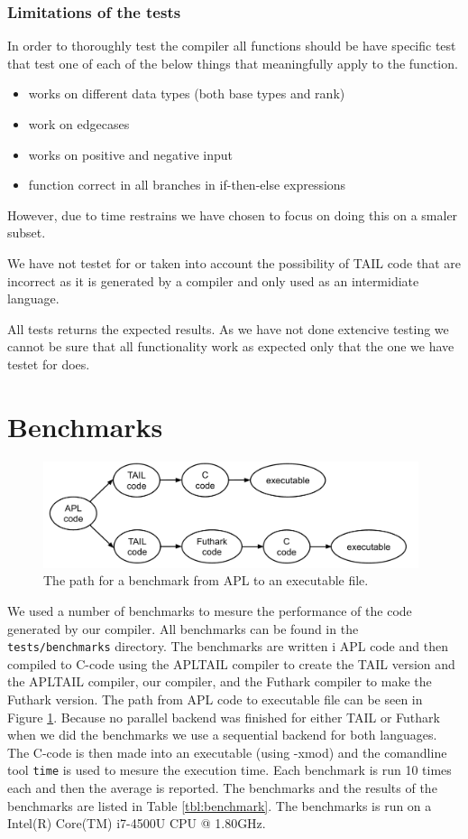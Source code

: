 \documentclass[11pt]{article}
\begin{document}
\subsubsection{Limitations of the tests}
In order to thoroughly test the compiler all functions should be have specific test that test one of each of the below things
that meaningfully apply to the function. 
\begin{itemize}
\item works on different data types (both base types and rank)
\item work on edgecases
\item works on positive and negative input
\item function correct in all branches in if-then-else expressions
\end{itemize}
However, due to time restrains we have chosen to focus on doing this on a smaler subset. 

We have not testet for or taken into account the possibility of TAIL code that are incorrect as it is generated by a compiler and only used as an intermidiate language. 

All tests returns the expected results. 
As we have not done extencive testing we cannot be sure that all functionality work as expected only that the one we have testet for does. 

\section{Benchmarks}
\label{sec:benchmarks}
\begin{figure}
\label{fig:code}
\begin{center}
    \includegraphics[width=11cm]{code.png}
    \caption{The path for a benchmark from APL to an executable file.}
\end{center}
\end{figure}

We used a number of benchmarks to mesure the performance of the code generated by our compiler. 
All benchmarks can be found in the {\tt tests/benchmarks} directory. 
The benchmarks are written i APL code and then compiled to C-code using the APLTAIL compiler to create the TAIL version and the APLTAIL compiler, our compiler, and the Futhark compiler to make the Futhark version. The path from APL code to executable file can be seen in Figure \ref{fig:code}.
Because no parallel backend was finished for either TAIL or Futhark when we did the benchmarks we use a sequential backend for both languages. 
The C-code is then made into an executable (using -xmod) and the comandline tool {\tt time} is used to mesure the execution time. Each benchmark is run 10 times each and then the average is reported. The benchmarks and the results of the benchmarks are listed in Table \ref{tbl:benchmark}.
The benchmarks is run on a Intel(R) Core(TM) i7-4500U CPU @ 1.80GHz. 
\end{document}
